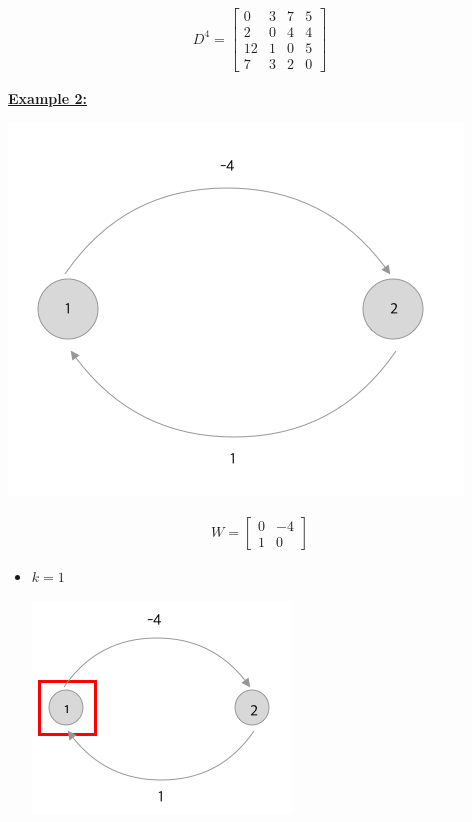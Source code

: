\documentclass[12pt]{article}
\begin{document}
\begin{enumerate}[1.]
\begin{itemize}
\begin{itemize}
\begin{itemize}
                \begin{align}
                    D^4 = \begin{bmatrix}
                        0 & 3 & 7 & 5 \\
                        2 & 0 & 4 & 4 \\
                        12 & 1 & 0 & 5\\
                        7 & 3 & 2 & 0
                    \end{bmatrix}
                \end{align}
            \end{itemize}

            \bigskip

            \underline{\textbf{Example 2:}}

            \begin{center}
            \includegraphics[width=0.5\linewidth]{images/worksheet_4_solution_52.png}
            \end{center}

            \begin{align}
                W = \begin{bmatrix}
                    0 & -4\\
                    1 & 0
                \end{bmatrix}
            \end{align}

            \bigskip

            \begin{itemize}
                \item $k = 1$

                \begin{center}
                \includegraphics[width=0.5\linewidth]{images/worksheet_4_solution_53.png}
                \end{center}


\end{itemize}
\end{itemize}
\end{itemize}
\end{enumerate}
\end{document}
